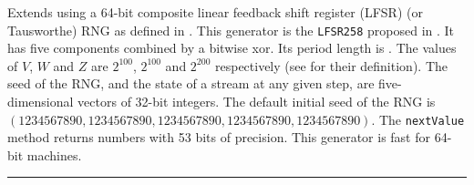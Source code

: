 
Extends  using a  64-bit composite linear feedback
shift register (LFSR) (or Tausworthe) RNG as defined in
\cite{rLEC96a,rTEZ91b}.
This generator is the \texttt{LFSR258} proposed in \cite{rLEC99a}.
It has five components combined by a bitwise xor.
Its period length is 
. The values of $V$, $W$ and $Z$ are $2^{100}$,
$2^{100}$ and $2^{200}$ respectively (see  for their
definition). The seed of the RNG, and the state of a stream at any given
step, are five-dimensional vectors of 32-bit integers.
The default initial seed of the RNG is $(1234567890, 1234567890,
1234567890, 1234567890, 1234567890)$.
The \texttt{nextValue} method returns numbers with 53 bits of precision.
This generator is fast for 64-bit machines.

\bigskip\hrule

